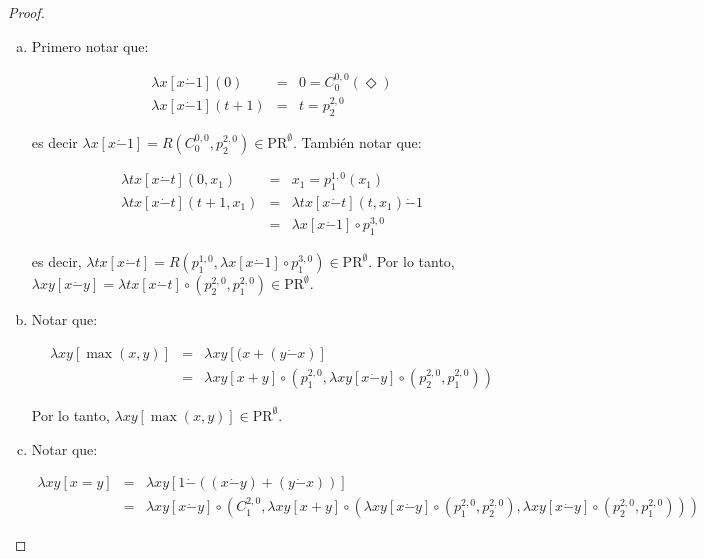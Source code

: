   \begin{proof}
    \begin{enumerate}[a)]
      \item Primero notar que:

        \begin{eqnarray*}
          \lambda x \left[x \dot{-}1\right](0) &=& 0 = C_{0}^{0,0}(\Diamond) \\
          \lambda x \left[x \dot{-}1\right](t+1) &=& t = p_{2}^{2,0}
        \end{eqnarray*}

        \PN es decir $\lambda x \left[x \dot{-}1\right] = R(C_{0}^{0,0}, p_{2}^{2,0}) \in \mathrm{PR}^{\emptyset}$.
        \PN También notar que:

        \begin{eqnarray*}
          \lambda tx \left[x \dot{-}t\right](0, x_{1}) &=& x_{1} = p_{1}^{1,0}(x_{1}) \\
          \lambda tx \left[x \dot{-}t\right](t+1, x_{1}) &=& \lambda tx \left[x \dot{-}t\right](t, x_{1})
            \dot{-} 1\\
          &=& \lambda x \left[x \dot{-}1\right] \circ p_{1}^{3,0}
        \end{eqnarray*}

        \PN es decir, $\lambda tx \left[x \dot{-}t\right] = R(p_{1}^{1,0}, \lambda x \left[x \dot{-}1\right] \circ
        p_{1}^{3,0}) \in \mathrm{PR}^{\emptyset}$.
        \PN Por lo tanto, $\lambda xy \left[x \dot{-}y\right] = \lambda tx \left[x \dot{-}t\right] \circ (p_{2}^{2,0},
        p_{1}^{2,0}) \in \mathrm{PR}^{\emptyset}$.

      \item Notar que:

        \begin{eqnarray*}
          \lambda xy \left[\max (x,y)\right] &=& \lambda xy \left[(x + (y \dot{-}x)\right] \\
          &=& \lambda xy \left[x+y\right] \circ \left(p_{1}^{2,0}, \lambda xy \left[x \dot{-}y\right] \circ
            (p_{2}^{2,0}, p_{1}^{2,0})\right)
        \end{eqnarray*}

        \PN Por lo tanto, $\lambda xy \left[\max (x,y)\right] \in \mathrm{PR}^{\emptyset}$.

      \item Notar que:

        \begin{eqnarray*}
          \lambda xy \left[x=y\right] &=& \lambda xy \left[1 \dot{-}((x \dot{-} y) + (y \dot{-} x))\right] \\
          &=& \lambda xy \left[x \dot{-}y\right] \circ (C_{1}^{2,0}, \lambda xy \left[x+y\right] \circ
            (\lambda xy \left[x \dot{-}y\right] \circ (p_{1}^{2,0}, p_{2}^{2,0}), \lambda xy \left[x \dot{-}y\right]
            \circ (p_{2}^{2,0}, p_{1}^{2,0})))
        \end{eqnarray*}


\end{enumerate}
\end{proof}
